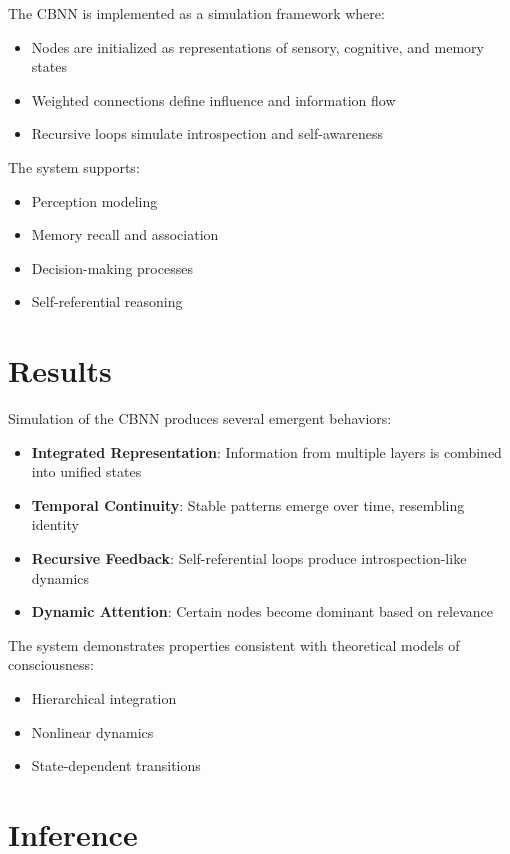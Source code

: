 \documentclass[12pt]{article}
\begin{document}
The CBNN is implemented as a simulation framework where:

\begin{itemize}
\item Nodes are initialized as representations of sensory, cognitive, and memory states
\item Weighted connections define influence and information flow
\item Recursive loops simulate introspection and self-awareness
\end{itemize}

The system supports:

\begin{itemize}
\item Perception modeling
\item Memory recall and association
\item Decision-making processes
\item Self-referential reasoning
\end{itemize}

\section{Results}

Simulation of the CBNN produces several emergent behaviors:

\begin{itemize}
\item \textbf{Integrated Representation}: Information from multiple layers is combined into unified states
\item \textbf{Temporal Continuity}: Stable patterns emerge over time, resembling identity
\item \textbf{Recursive Feedback}: Self-referential loops produce introspection-like dynamics
\item \textbf{Dynamic Attention}: Certain nodes become dominant based on relevance
\end{itemize}

The system demonstrates properties consistent with theoretical models of consciousness:

\begin{itemize}
\item Hierarchical integration
\item Nonlinear dynamics
\item State-dependent transitions
\end{itemize}

\section{Inference}
\end{document}
